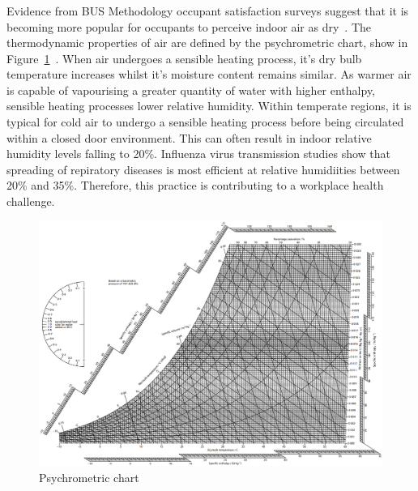 \documentclass[11pt, oneside]{book}   	%
\begin{document}
\subsubsection{\color{Blue}{P3: Dry Workplaces During Winter}}
Evidence from BUS Methodology occupant satisfaction surveys suggest that it is becoming more popular for occupants to perceive indoor air as dry~\cite{busM}.
The thermodynamic properties of air are defined by the psychrometric chart, show in Figure~\ref{Psychrometric Chart figure}~\cite{cibse1}.
When air undergoes a sensible heating process, it's dry bulb temperature increases whilst it's moisture content remains similar.
As warmer air is capable of vapourising a greater quantity of water with higher enthalpy, sensible heating processes lower relative humidity.
Within temperate regions, it is typical for cold air to undergo a sensible heating process before being circulated within a closed door environment.
This can often result in indoor relative humidity levels falling to 20\%.
Influenza virus transmission studies show that spreading of repiratory diseases is most efficient at relative humidiities between 20\% and 35\%.
Therefore, this practice is contributing to a workplace health challenge.\

\pagebreak

\FloatBarrier
\begin{figure}
\begin{center}
\includegraphics[width=1\textwidth]{psychrometricChart.png}
\caption{Psychrometric chart}
\label{Psychrometric Chart figure}
\end{center}
\end{figure}
\FloatBarrier
\end{document}
